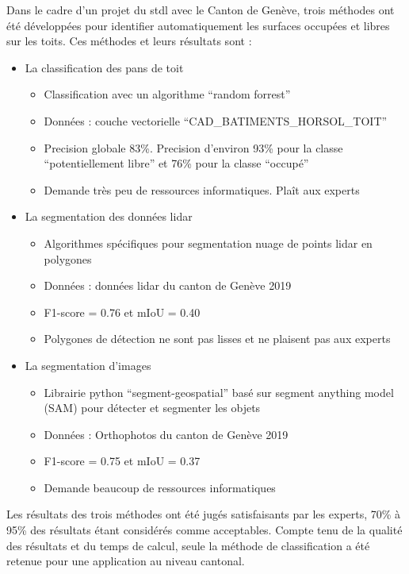 \par{Dans le cadre d'un projet \cite{herny_detection_2024} du \acrshort{stdl} avec le Canton de Genève, trois méthodes ont été développées pour identifier automatiquement les surfaces occupées et libres sur les toits. Ces méthodes et leurs résultats sont :}
\begin{itemize}
    \item La classification des pans de toit
    \begin{itemize}
        \item Classification avec un algorithme ``random forrest''
        \item Données : couche vectorielle ``CAD\_BATIMENTS\_HORSOL\_TOIT'' \cite{sitg_toits_nodate}
        \item Precision globale 83\%. Precision d'environ 93\% pour la classe ``potentiellement libre'' et 76\% pour la classe ``occupé''
        \item Demande très peu de ressources informatiques. Plaît aux experts
    \end{itemize}
    \item La segmentation des données \gls{lidar}
    \begin{itemize}
        \item Algorithmes spécifiques pour segmentation nuage de points \gls{lidar} en polygones
        \item Données : données \gls{lidar} du canton de Genève 2019 \cite{sitg_nuages_2019}
        \item F1-score = 0.76 et mIoU = 0.40
        \item Polygones de détection ne sont pas lisses et ne plaisent pas aux experts
    \end{itemize}
    \item La segmentation d'images
    \begin{itemize}
        \item Librairie python ``segment-geospatial'' \cite{wu_samgeo_2023} basé sur segment anything model (SAM) pour détecter et segmenter les objets
        \item Données : Orthophotos du canton de Genève 2019 \cite{sitg_orthophotos_nodate}
        \item F1-score = 0.75 et mIoU = 0.37
        \item Demande beaucoup de ressources informatiques
    \end{itemize}
\end{itemize}

\par{Les résultats des trois méthodes ont été jugés satisfaisants par les experts, 70\% à 95\% des résultats étant considérés comme acceptables. Compte tenu de la qualité des résultats et du temps de calcul, seule la méthode de classification a été retenue pour une application au niveau cantonal.}

